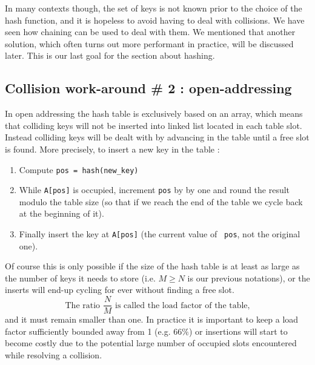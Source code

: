 \documentclass[12pt]{article}
\theoremstyle{plain}
\theoremstyle{remark}
\begin{document}
\medskip

In many contexts though, the set of keys is not known prior to the choice of the
hash function, and it is hopeless to avoid having to deal with collisions. We
have seen how chaining can be used to deal with them. We mentioned that another
solution, which often turns out more performant in practice, will be discussed
later. This is our last goal for the section about hashing.

\subsection{Collision work-around \# 2 : open-addressing} 

In open addressing the hash table is exclusively based on an array, which means that
colliding keys will not be inserted into linked list located in each table
slot. Instead colliding keys will be dealt with by advancing in the table until
a free slot is found. More precisely, to insert a new key in the table :
\begin{enumerate}
	\item Compute {\tt pos = hash(new\_key)}
	\item While {\tt A[pos]} is occupied, increment {\tt pos} by by one and round
		the result modulo the table size (so that if we reach the end of
		the table we cycle back at the beginning of it).
	\item Finally insert the key at {\tt A[pos]} (the current value of {\tt
		pos}, not the original one).
\end{enumerate}

Of course this is only possible if the size of the hash table is at least as
large as the number of keys it needs to store (i.e. $M \geq N$ is our previous
notations), or the inserts will end-up cycling for ever without finding a free
slot.
$$
\text{The ratio } \frac{N}{M} \text{ is called the load factor of the table,}
$$
and it must remain smaller than one. In practice it is important to keep
a load factor sufficiently bounded away from 1 (e.g. $66\%$) or insertions
will start to become costly due to the potential large number of occupied slots 
encountered while resolving a collision.

\medskip
\end{document}
